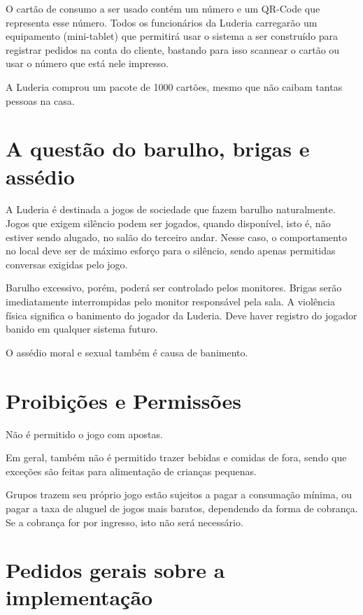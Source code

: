 O cartão de consumo a ser usado contém um número e um QR-Code que representa esse número. Todos os funcionários da Luderia carregarão um equipamento (mini-tablet) que permitirá usar o sistema a ser construído para registrar pedidos na conta do cliente, bastando para isso scannear o cartão ou usar o número que está nele impresso.

A Luderia comprou um pacote de 1000 cartões, mesmo que não caibam tantas pessoas na casa.

\section{A questão do barulho, brigas e assédio}

A Luderia é destinada a jogos de sociedade que fazem barulho naturalmente. Jogos que exigem silêncio podem ser jogados, quando disponível, isto é, não estiver sendo alugado, no salão do terceiro andar. Nesse caso, o comportamento no local deve ser de máximo esforço para o silêncio, sendo apenas permitidas conversas exigidas pelo jogo.

Barulho excessivo, porém, poderá ser controlado pelos monitores. Brigas serão imediatamente interrompidas pelo monitor responsável pela sala. A violência física significa o banimento do jogador da Luderia. Deve haver registro do jogador banido em qualquer sistema futuro.

O assédio moral e sexual também é causa de banimento.

\section{Proibições e Permissões}

Não é permitido o jogo com apostas. 

Em geral, também não é permitido trazer bebidas e comidas de fora, sendo que exceções são feitas para alimentação de crianças pequenas.

Grupos trazem seu próprio jogo estão sujeitos a pagar a consumação mínima, ou pagar a taxa de aluguel de jogos mais baratos, dependendo da forma de cobrança. Se a cobrança for por ingresso, isto não será necessário.

\section{Pedidos gerais sobre a implementação}

